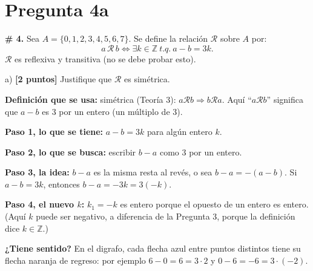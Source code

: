 \documentclass[11pt]{article}
\newcommand{\R}{\mathcal R}
\newcommand{\hl}[1]{\colorbox{green!35}{#1}}
\begin{document}
\clearpage
\section*{Pregunta 4a}

\textbf{\# 4.} Sea $A=\{0,1,2,3,4,5,6,7\}$. Se define la relación $\R$ sobre $A$ por:
\[a\,\R\,b\iff\exists k\in\mathbb Z\ t.q.\ a-b=3k.\]
$\R$ es reflexiva y transitiva (no se debe probar esto).

a) \textbf{[2 puntos]} Justifique que $\R$ es \hl{simétrica}.

\begin{center}
\end{center}


\begin{explica}
\textbf{Definición que se usa:} simétrica (Teoría 3): $a\R b\Rightarrow b\R a$. Aquí ``$a\R b$'' significa que $a-b$ es $3$ por un entero (un múltiplo de $3$).

\textbf{Paso 1, lo que se tiene:} $a-b=3k$ para algún entero $k$.

\textbf{Paso 2, lo que se busca:} escribir $b-a$ como $3$ por un entero.

\textbf{Paso 3, la idea:} $b-a$ es la misma resta al revés, o sea $b-a=-(a-b)$. Si $a-b=3k$, entonces $b-a=-3k=3(-k)$.

\textbf{Paso 4, el nuevo $k$:} $k_1=-k$ es entero porque el opuesto de un entero es entero. (Aquí $k$ puede ser negativo, a diferencia de la Pregunta 3, porque la definición dice $k\in\mathbb Z$.)

\textbf{¿Tiene sentido?} En el digrafo, cada flecha azul entre puntos distintos tiene su flecha naranja de regreso: por ejemplo $6-0=6=3\cdot2$ y $0-6=-6=3\cdot(-2)$.
\end{explica}
\end{document}
